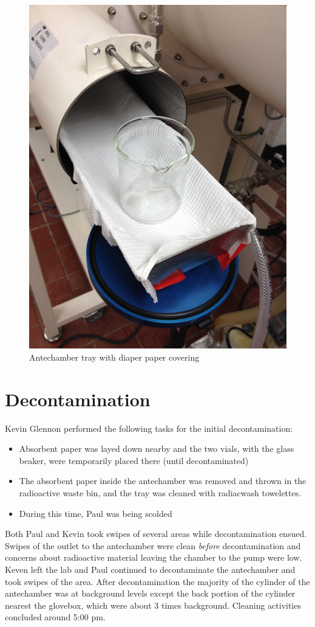 \documentclass[11pt,notitlepage]{article}
\begin{document}
\begin{figure}[H] %
\begin{center}
  \includegraphics[angle=270,width=0.75\linewidth]
                  {Figures/image2}
\end{center}
\caption{Antechamber tray with diaper paper covering}
\label{fig:fig2}
\end{figure}


\section{Decontamination}

Kevin Glennon performed the following tasks for the
initial decontamination:
\begin{itemize}
\item{Absorbent paper was layed down nearby and the two vials,
  with the glass beaker, were temporarily placed there
(until decontaminated)}
\item{The absorbent paper inside the antechamber was removed
  and thrown in the radioactive waste bin, and the tray was
  cleaned with radiacwash towelettes.}
\item{During this time, Paul was being scolded}
\end{itemize}
Both Paul and Kevin took swipes of several areas while
decontamination ensued. Swipes of the outlet to the antechamber
were clean \textit{before} decontamination and concerns
about radioactive material leaving the chamber to the pump
were low.
Keven left the lab and Paul
continued to decontaminate the antechamber and took
swipes of the area.
After decontamination the majority of the cylinder
of the antechamber was at background levels except the back
portion of the cylinder nearest the glovebox, which
were about 3 times background. Cleaning activities concluded
around 5:00 pm.
\end{document}
